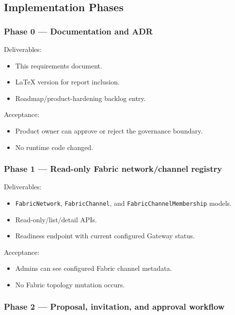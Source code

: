 \subsection{Implementation Phases}

\subsubsection{Phase 0 --- Documentation and ADR}

Deliverables:

\begin{itemize}
  \item This requirements document.
  \item LaTeX version for report inclusion.
  \item Roadmap/product-hardening backlog entry.
\end{itemize}

Acceptance:

\begin{itemize}
  \item Product owner can approve or reject the governance boundary.
  \item No runtime code changed.
\end{itemize}

\subsubsection{Phase 1 --- Read-only Fabric network/channel registry}

Deliverables:

\begin{itemize}
  \item \texttt{FabricNetwork}, \texttt{FabricChannel}, and \texttt{FabricChannelMembership} models.
  \item Read-only/list/detail APIs.
  \item Readiness endpoint with current configured Gateway status.
\end{itemize}

Acceptance:

\begin{itemize}
  \item Admins can see configured Fabric channel metadata.
  \item No Fabric topology mutation occurs.
\end{itemize}

\subsubsection{Phase 2 --- Proposal, invitation, and approval workflow}

